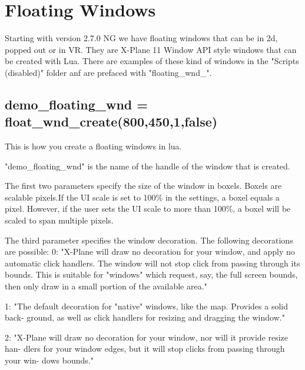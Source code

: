 \documentclass[11pt,parskip=half,a4paper]{scrartcl}
\begin{document}
\newpage
\section{Floating Windows}

Starting with version 2.7.0 NG we have floating windows that can be in 2d, popped out or in VR. They are X-Plane 11 Window API style windows that can be created with Lua. There are examples of these kind of windows in the "Scripts (disabled)" folder anf are prefaced with "floating\_wnd\_".

\subsection{\hspace*{1.0mm}demo\_floating\_wnd = float\_wnd\_create(800,450,1,false)}

This is how you create a floating windows in lua.

"demo\_floating\_wnd" is the name of the handle of the window that is created.

The first two parameters specify the size of the window in boxels. Boxels are scalable pixels.If the UI scale is set to 100\% in the settings, a boxel equals a pixel. However, if the user sets the UI scale to more than 100\%, a boxel will be scaled to span multiple pixels.

The third parameter specifies the window decoration. The following decorations are possible:
\hspace*{10mm}	0: "X-Plane will draw no decoration for your window, and apply no automatic click
\hspace*{10mm}	handlers. The window will not stop click from passing through its bounds. This is
\hspace*{10mm}	suitable for "windows" which request, say, the full screen bounds, then only draw in
\hspace*{10mm}	a small portion of the available area."

\hspace*{10mm}	1: "The default decoration for "native" windows, like the map. Provides a solid back-    \hspace*{10mm}  ground, as well as click handlers for resizing and dragging the window."

\hspace*{10mm}	2: "X-Plane will draw no decoration for your window, nor will it provide resize han-
\hspace*{10mm}	dlers for your window edges, but it will stop clicks from passing through your win-
\hspace*{10mm}	dows bounds."
\end{document}
